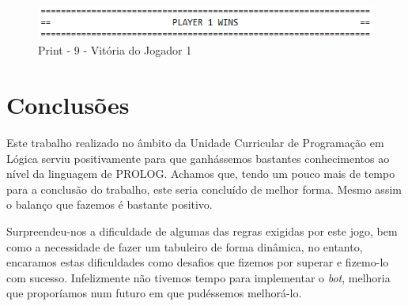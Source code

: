 \documentclass[a4paper]{article}
\begin{document}
	\begin{figure}[ht!]
	\centering
	\includegraphics[scale = 1]{./res/print3.png}
	\caption{Print - 9 - Vitória do Jogador 1 \label{Print - 9}}
	\end{figure}

	\clearpage

	\section{Conclusões}

	Este trabalho realizado no âmbito da Unidade Curricular de Programação em Lógica serviu positivamente para que ganhássemos bastantes conhecimentos ao nível da linguagem de PROLOG. Achamos que, tendo um pouco mais de tempo para a conclusão do trabalho, este seria concluído de melhor forma. Mesmo assim o balanço que fazemos é bastante positivo.

	Surpreendeu-nos a dificuldade de algumas das regras exigidas por este jogo, bem como a necessidade de fazer um tabuleiro de forma dinâmica, no entanto, encaramos estas dificuldades como desafios que fizemos por superar e fizemo-lo com sucesso. Infelizmente não tivemos tempo para implementar o \textit{bot}, melhoria que proporíamos num futuro em que pudéssemos melhorá-lo.



	
\end{document}
